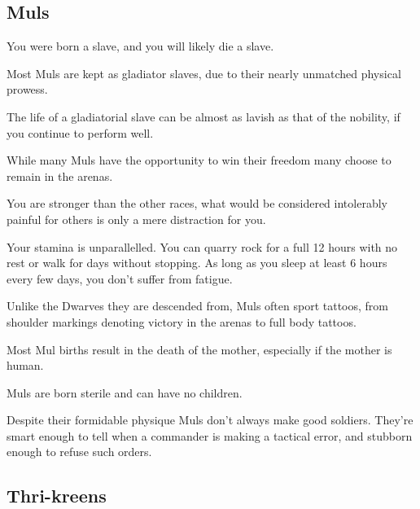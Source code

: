 \begin{multicols}{2}
\subsection{Muls}

\begin{description}
    \item You were born a slave, and you will likely die a slave.
    \item Most Muls are kept as gladiator slaves, due to their nearly unmatched physical prowess.
    \item The life of a gladiatorial slave can be almost as lavish as that of the nobility, if you continue to perform well.
    \item While many Muls have the opportunity to win their freedom many choose to remain in the arenas.
    \item You are stronger than the other races, what would be considered intolerably painful for others is only a mere distraction for you.
    \item Your stamina is unparallelled. You can quarry rock for a full 12 hours with no rest or walk for days without stopping. As long as you sleep at least 6 hours every few days, you don’t suffer from fatigue.
    \item Unlike the Dwarves they are descended from, Muls often sport tattoos, from shoulder markings denoting victory in the arenas to full body tattoos.
    \item Most Mul births result in the death of the mother, especially if the mother is human.
    \item Muls are born sterile and can have no children.
    \item Despite their formidable physique Muls don’t always make good soldiers. They’re smart enough to tell when a commander is making a tactical error, and stubborn enough to refuse such orders.
\end{description}

\subsection{Thri-kreens}


\end{multicols}
